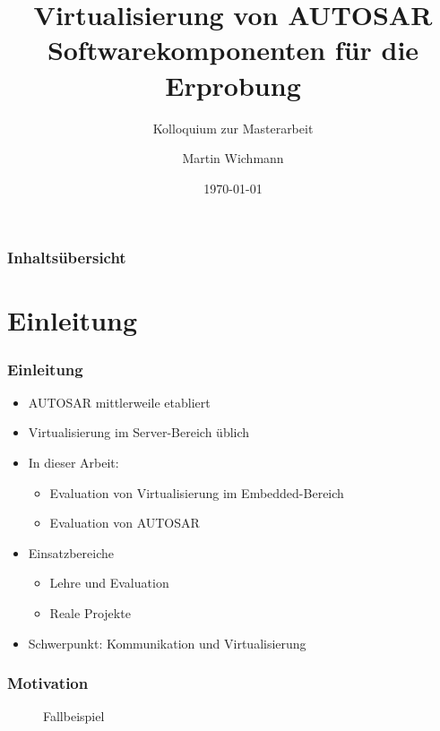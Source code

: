 \documentclass[]{beamer}
\author{Martin Wichmann}
\title[Virtualisierung von AUTOSAR Softwarekomponenten]{Virtualisierung von AUTOSAR Softwarekomponenten für die Erprobung}
\subtitle{Kolloquium zur Masterarbeit}
\date{\today}
\institute{Ostfalia Hochschule für angewandte Wissenschaften}
\newcommand{\inputImage}[1]{}
\begin{document}
\begin{frame}
\maketitle
\end{frame}


\begin{frame}
\frametitle{Inhaltsübersicht}
\tableofcontents[hideallsubsections] %
\end{frame}





\section{Einleitung}
\label{sec:einleitung}

\begin{frame}
\frametitle{Einleitung}
    \begin{itemize}
        \item AUTOSAR mittlerweile etabliert
        \item Virtualisierung im Server-Bereich üblich
        \item In dieser Arbeit:
        \begin{itemize}
            \item Evaluation von Virtualisierung im Embedded-Bereich
            \item Evaluation von AUTOSAR
        \end{itemize}
        \item Einsatzbereiche
        \begin{itemize}
            \item Lehre und Evaluation
            \item Reale Projekte
        \end{itemize}
        \item Schwerpunkt: Kommunikation und Virtualisierung
    \end{itemize}
\end{frame}



\begin{frame}
\frametitle{Motivation}
    \begin{figure}[ht]
        \centering
        \resizebox{0.9\linewidth}{!}{\inputImage{arch_begin.dia}}
        \caption{Fallbeispiel}
        \label{fig:fallbeispiel}
    \end{figure}
\end{frame}
\end{document}
